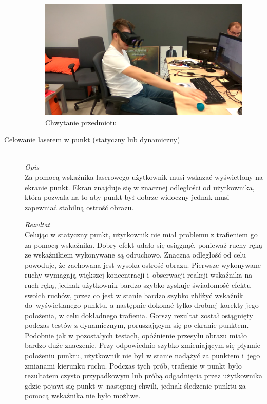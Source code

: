 \documentclass[a4paper,11pt,twoside]{report}
\theoremstyle{definition}
\begin{document}
\begin{description}
\begin{figure}[H]
\centering
\includegraphics[scale=0.18]{images/chwytaniePilki}
\caption[CaptureTest]{Chwytanie przedmiotu}
\end{figure}

\item[Celowanie laserem w punkt (statyczny lub dynamiczny)] \hfill \\
\textit{Opis} \\
Za pomocą wskaźnika laserowego użytkownik musi wskazać wyświetlony na ekranie punkt. Ekran znajduje się w znacznej odległości od użytkownika, która pozwala na to aby punkt był dobrze widoczny jednak musi zapewniać stabilną ostrość obrazu.

\textit{Rezultat} \\
Celując w statyczny punkt, użytkownik nie miał problemu z trafieniem go za pomocą wskaźnika. Dobry efekt udało się osiągnąć, ponieważ ruchy ręką ze wskaźnikiem wykonywane są odruchowo. Znaczna odległość od celu powoduje, że zachowana jest wysoka ostrość obrazu. Pierwsze wykonywane ruchy wymagają większej koncentracji i~obserwacji reakcji wskaźnika na ruch ręką, jednak użytkownik bardzo szybko zyskuje świadomość efektu swoich ruchów, przez co jest w stanie bardzo szybko zbliżyć wskaźnik do~wyświetlanego punktu, a następnie dokonać tylko drobnej korekty jego położenia, w celu dokładnego trafienia. Gorszy rezultat został osiągnięty podczas testów z dynamicznym, poruszającym się po ekranie punktem. Podobnie jak w pozostałych testach, opóźnienie przesyłu obrazu miało bardzo duże znaczenie. Przy odpowiednio szybko zmieniającym się płynnie położeniu punktu, użytkownik nie był w stanie nadążyć za punktem i~jego zmianami kierunku ruchu. Podczas tych prób, trafienie w punkt było rezultatem czysto przypadkowym lub próbą odgadnięcia przez użytkownika gdzie pojawi się punkt w~następnej chwili, jednak śledzenie punktu za pomocą wskaźnika nie było możliwe.


\end{description}
\end{document}
